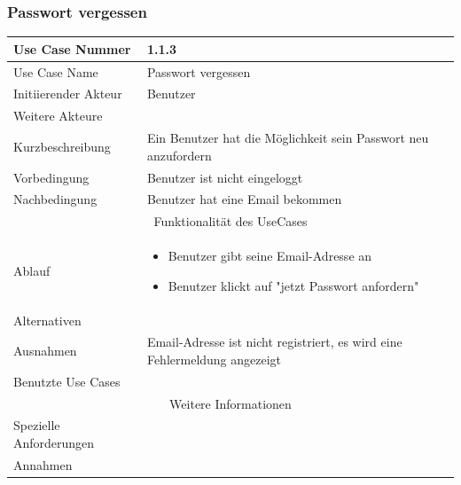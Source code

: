 \documentclass[10pt,a4paper]{article}
\begin{document}
	\subsubsection{Passwort vergessen}
		\begin{tabular}{|l|p{.5\linewidth}|}
		\hline Use Case Nummer & 1.1.3 \\ 
		\hline Use Case Name & Passwort vergessen \\ 
		\hline Initiierender Akteur & Benutzer \\
		\hline Weitere Akteure &  \\
		\hline Kurzbeschreibung & Ein Benutzer hat die M\"oglichkeit sein Passwort neu anzufordern \\
		\hline Vorbedingung & Benutzer ist nicht eingeloggt \\
		\hline Nachbedingung & Benutzer hat eine Email bekommen \\
		\hline \multicolumn{2}{|c|}{Funktionalität des UseCases}\\
		\hline Ablauf & \begin{itemize}
			\item Benutzer gibt seine Email-Adresse an
			\item Benutzer klickt auf "jetzt Passwort anfordern"
		\end{itemize} \\
		\hline Alternativen &  \\
		\hline Ausnahmen & Email-Adresse ist nicht registriert, es wird eine Fehlermeldung angezeigt \\
		\hline Benutzte Use Cases &  \\
		\hline \multicolumn{2}{|c|}{Weitere Informationen} \\
		\hline Spezielle Anforderungen &  \\
		\hline Annahmen &  \\
		\hline
		\end{tabular}
\end{document}
